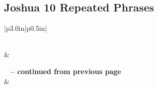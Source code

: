 \subsection{Joshua 10 Repeated Phrases}


\normalsize
 
\begin{center}
\begin{longtable}{|p{3.0in}|p{0.5in}|}
\caption[Joshua 10 Repeated Phrases]{Joshua 10 Repeated Phrases}\label{table:Repeated Phrases Joshua 10} \\
\hline {} &  \\ \hline 
\endfirsthead
 
{{\bfseries \tablename\ \thetable{} -- continued from previous page}} \\  
\hline {} &  \\ \hline 
\endhead
 

\end{longtable}
\end{center}
